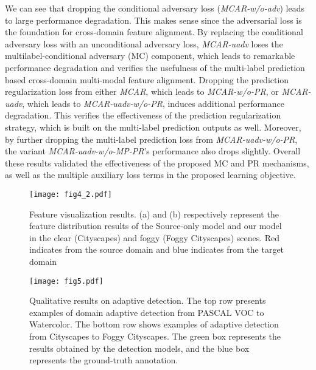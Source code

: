 \documentclass[runningheads]{llncs}
\begin{document}
We can see that dropping the conditional adversary loss ({\em MCAR-w/o-adv}) 
leads to large performance degradation. 
This makes sense since the adversarial loss
is the foundation for cross-domain feature alignment. 
By replacing the conditional adversary loss with an unconditional adversary loss,
{\em MCAR-uadv} loses the multilabel-conditional adversary (MC) component, 
which leads to remarkable performance degradation 
and verifies the usefulness of 
the multi-label prediction based cross-domain multi-modal 
feature alignment. 
Dropping the prediction regularization loss 
from either {\em MCAR}, which leads to {\em MCAR-w/o-PR}, 
or {\em MCAR-uadv}, which leads to {\em MCAR-uadv-w/o-PR},
induces additional performance degradation.
This verifies the effectiveness of the prediction regularization strategy,
which is built on the multi-label prediction outputs as well.
Moreover, 
by further dropping the multi-label prediction loss from {\em MCAR-uadv-w/o-PR},
the variant {\em MCAR-uadv-w/o-MP-PR}'s performance also drops slightly.
Overall these results validated the effectiveness of the proposed MC and PR mechanisms,
as well as the multiple auxiliary loss terms in the proposed learning objective.









\begin{figure}[ht]
\begin{center}
\texttt{[image: fig4\_2.pdf]}
\end{center}
\caption{Feature visualization results. (a) and (b) respectively represent the feature distribution results of the Source-only model and our model in the clear (Cityscapes) and foggy (Foggy Cityscapes) scenes. Red indicates from the source domain and blue indicates from the target domain}
\label{fig:four}
\end{figure}
\begin{figure*}[http]
\begin{center}
\texttt{[image: fig5.pdf]}
\end{center}
   \caption{Qualitative results on adaptive detection. 
	The top row presents examples of domain adaptive detection from PASCAL VOC to Watercolor. 
	The bottom row shows examples of adaptive detection from Cityscapes to Foggy Cityscapes. 
	The green box represents the results obtained by the detection models, and the blue box represents the ground-truth annotation.}
\label{fig:five}
\end{figure*}
\end{document}
